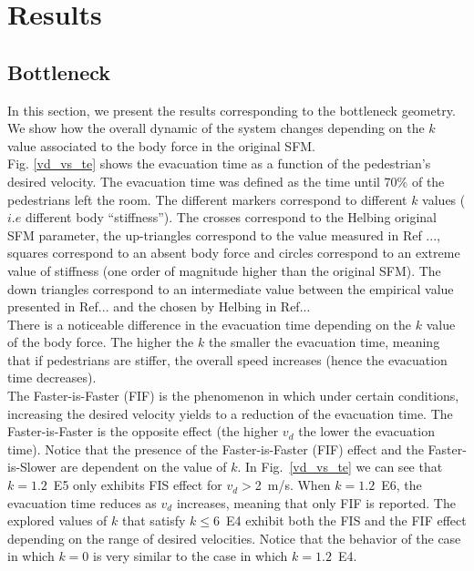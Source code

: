 \documentclass[preprint,12pt]{elsarticle}
\begin{document}
\section{\label{results}Results}


\subsection{\label{bottleneck} Bottleneck}


In this section, we present the results corresponding to the bottleneck geometry. We show how the overall dynamic of the system changes depending on the $k$ value associated to the body force in the original SFM.\\

Fig. \ref{vd_vs_te} shows the evacuation time as a function of the pedestrian's desired velocity. The evacuation time was defined as the time until 70\% of the pedestrians left the room. The different markers correspond to different $k$ values ($i.e$ different body ``stiffness''). The crosses correspond to the Helbing original SFM parameter, the up-triangles correspond to the value measured in Ref ..., squares correspond to an absent body force and circles correspond to an extreme value of stiffness (one order of magnitude higher than the original SFM). The down triangles correspond to an intermediate value between the empirical value presented in Ref... and the chosen by Helbing in Ref...\\

There is a noticeable difference in the evacuation time depending on the $k$ value of the body force. The higher the $k$ the smaller the evacuation time, meaning that if pedestrians are stiffer, the overall speed increases (hence the evacuation time decreases).\\

The Faster-is-Faster (FIF) is the phenomenon in which under certain conditions, increasing the desired velocity yields to a reduction of the evacuation time. The Faster-is-Faster is the opposite effect (the higher $v_d$ the lower the evacuation time).  Notice that the presence of the Faster-is-Faster (FIF) effect and the Faster-is-Slower are dependent on the value of $k$. In Fig.~\ref{vd_vs_te} we can see that $k=1.2$~E5 only exhibits FIS effect for $v_d>$2~m/s. When $k=1.2$~E6, the evacuation time reduces as $v_d$ increases, meaning that only FIF is reported. The explored values of $k$ that satisfy $k \leq 6$~E4 exhibit both the FIS and the FIF effect depending on the range of desired velocities. Notice that the behavior of the case in which $k = 0$ is very similar to the case in which $k = 1.2$~E4.\\
 
\end{document}
